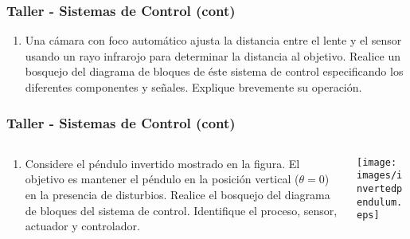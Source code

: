 \documentclass[aspectratio=169]{beamer}
\theoremstyle{definition}
\theoremstyle{plain}
\theoremstyle{remark}
\newcounter{saveenumi}
\newcommand{\seti}{\setcounter{saveenumi}{\value{enumi}}}
\newcommand{\conti}{\setcounter{enumi}{\value{saveenumi}}}
\begin{document}
\begin{frame}[c]\frametitle{Taller - Sistemas de Control (cont)}
\begin{enumerate}
  \conti
  \item Una cámara con foco automático ajusta la distancia entre el lente y el sensor usando un rayo infrarojo para determinar la distancia al objetivo. Realice un bosquejo del diagrama de bloques de éste sistema de control especificando los diferentes componentes y señales. Explique brevemente su operación.
  \seti
\end{enumerate}
\end{frame}

\begin{frame}[c]\frametitle{Taller - Sistemas de Control (cont)}
\begin{columns}
  \begin{column}{0.5\textwidth}
    \begin{enumerate}
      \conti
      \item Considere el péndulo invertido mostrado en la figura. El objetivo es mantener el péndulo en la posición vertical ($\theta = 0$) en la presencia de disturbios. Realice el bosquejo del diagrama de bloques del sistema de control. Identifique el proceso, sensor, actuador y controlador.
    \end{enumerate}
  \end{column} 
  \begin{column}{0.5\textwidth}
   \centering
   \texttt{[image: images/invertedpendulum.eps]}
  \end{column} 
\end{columns}
\end{frame}
\end{document}

